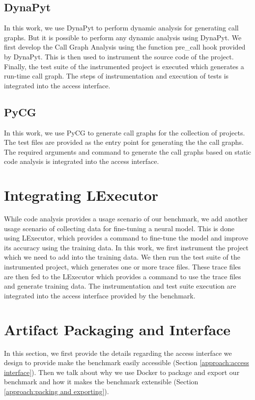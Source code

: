 \subsection{DynaPyt}
In this work, we use DynaPyt to perform dynamic analysis for generating call graphs.
But it is possible to perform any dynamic analysis using DynaPyt.
We first develop the Call Graph Analysis using the function pre\_call hook provided by DynaPyt.
This is then used to instrument the source code of the project.
Finally, the test suite of the instrumented project is executed which generates a run-time call graph.
The steps of instrumentation and execution of tests is integrated into the access interface. 

\subsection{PyCG}
In this work, we use PyCG to generate call graphs for the collection of projects.
The test files are provided as the entry point for generating the the call graphs.
The required arguments and command to generate the call graphs based on static code analysis is integrated into the access interface.

\section{Integrating LExecutor}
\label{approach:LExecutor}
While code analysis provides a usage scenario of our benchmark, we add another usage scenario of collecting data for fine-tuning a neural model.
This is done using LExecutor, which provides a command to fine-tune the model and improve its accuracy using the training data.
In this work, we first instrument the project which we need to add into the training data.
We then run the test suite of the instrumented project, which generates one or more trace files.
These trace files are then fed to the LExecutor which provides a command to use the trace files and generate training data.
The instrumentation and test suite execution are integrated into the access interface provided by the benchmark.

\section{Artifact Packaging and Interface}
\label{approach:artifact packaging and interface}
In this section, we first provide the details regarding the access interface we design to provide make the benchmark easily accessible (Section \ref{approach:access interface}).
Then we talk about why we use Docker to package and export our benchmark and how it makes the benchmark extensible (Section \ref{approach:packing and exporting}).

